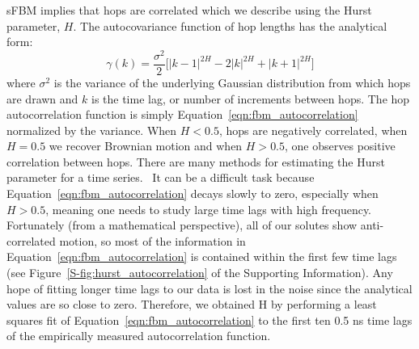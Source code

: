 \documentclass{article}
\begin{document}
  sFBM implies that hops are correlated which we describe using the Hurst parameter, $H$. 
  The autocovariance function of hop lengths has the analytical form:~\cite{mandelbrot_fractional_1968}
  \begin{equation}
    \gamma(k) = \dfrac{\sigma^2}{2}\bigg[|k-1|^{2H} - 2|k|^{2H} + |k+1|^{2H}\bigg]
  \label{eqn:fbm_autocorrelation}
  \end{equation}
  where $\sigma^2$ is the variance of the underlying Gaussian distribution from which hops are
  drawn and $k$ is the time lag, or number of increments between hops. The hop autocorrelation
  function is simply Equation~\ref{eqn:fbm_autocorrelation} normalized by the variance. 
  When $H < 0.5$, hops are negatively correlated, when $H = 0.5$ we recover Brownian motion
  and when $H > 0.5$, one observes positive correlation between hops. There are many methods
  for estimating the Hurst parameter for a time series.~\cite{clegg_practical_2006} It can
  be a difficult task because Equation~\ref{eqn:fbm_autocorrelation} decays slowly to zero, 
  especially when $H > 0.5$, meaning one needs to study large time lags with high frequency.
  Fortunately (from a mathematical perspective), all of our solutes show anti-correlated motion, so most of the information in
  Equation~\ref{eqn:fbm_autocorrelation} is contained within the first few time lags (see 
  Figure~\ref{S-fig:hurst_autocorrelation} of the Supporting Information). Any hope of
  fitting longer time lags to our data is lost in the noise since the analytical values
  are so close to zero. Therefore, we obtained H by performing a least squares fit of 
  Equation~\ref{eqn:fbm_autocorrelation} to the first 
  ten  
  0.5 ns time lags of the 
  empirically measured autocorrelation function.
\end{document}
